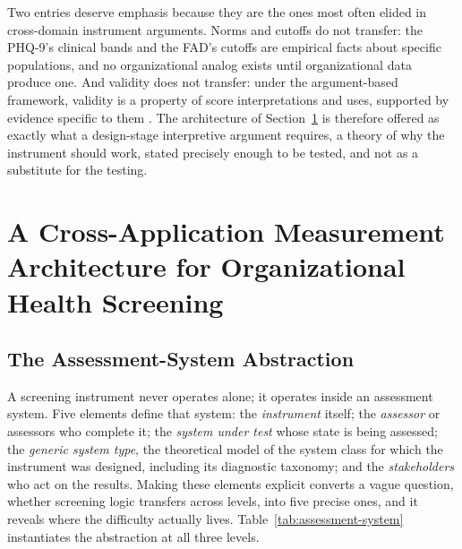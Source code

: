 \documentclass[12pt, letterpaper]{article}
\begin{document}
Two entries deserve emphasis because they are the ones most often elided in cross-domain instrument arguments. Norms and cutoffs do not transfer: the PHQ-9's clinical bands and the FAD's cutoffs are empirical facts about specific populations, and no organizational analog exists until organizational data produce one. And validity does not transfer: under the argument-based framework, validity is a property of score interpretations and uses, supported by evidence specific to them \parencite{kane2006,messick1995,aera2014}. The architecture of Section~\ref{sec:architecture} is therefore offered as exactly what a design-stage interpretive argument requires, a theory of why the instrument should work, stated precisely enough to be tested, and not as a substitute for the testing.

\section{A Cross-Application Measurement Architecture for Organizational Health Screening}
\label{sec:architecture}

\subsection{The Assessment-System Abstraction}
\label{sec:assessment-system}

A screening instrument never operates alone; it operates inside an assessment system. Five elements define that system: the \emph{instrument} itself; the \emph{assessor} or assessors who complete it; the \emph{system under test} whose state is being assessed; the \emph{generic system type}, the theoretical model of the system class for which the instrument was designed, including its diagnostic taxonomy; and the \emph{stakeholders} who act on the results. Making these elements explicit converts a vague question, whether screening logic transfers across levels, into five precise ones, and it reveals where the difficulty actually lives. Table~\ref{tab:assessment-system} instantiates the abstraction at all three levels.
\end{document}
